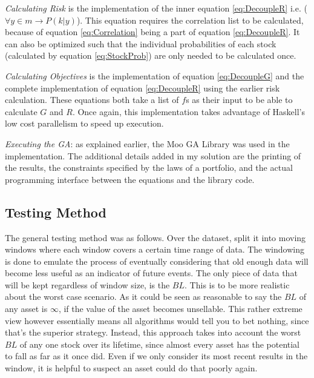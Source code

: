 \documentclass[11pt]{article}
\begin{document}
    \textit{Calculating Risk} is the implementation of the inner equation \ref{eq:DecoupleR} 
    i.e. (\(\forall y \in m \to P(k|y)\)). This equation
    requires the correlation list to be calculated, because of equation \ref{eq:Correlation} being a
    part of equation \ref{eq:DecoupleR}. It can also be optimized such that the individual
    probabilities of each stock (calculated by equation \ref{eq:StockProb}) are only needed to be
    calculated once.

    \textit{Calculating Objectives} is the implementation of equation \ref{eq:DecoupleG} and the complete
    implementation of equation \ref{eq:DecoupleR} using the earlier risk calculation. These
    equations both take a list of \(f\)s as their input to be able to calculate \(G\) and \(R\).
    Once again, this implementation takes advantage of Haskell's low cost parallelism to speed
    up execution.

    \textit{Executing the GA}: as explained earlier, the Moo GA Library \cite{Moo} was used in
    the implementation. The additional details added in my solution are the printing of the results,
    the constraints specified by the laws of a portfolio, and the actual programming interface
    between the equations and the library code.

\subsection{Testing Method}\label{section:TestingMethod}

    The general testing method was as follows. Over the dataset, split it into moving windows
    where each window covers a certain time range of data. The windowing is done to emulate
    the process of eventually considering that old enough data will become less useful
    as an indicator of future events. The only piece of data that will be kept regardless
    of window size, is the \(BL\). This is to be more realistic about the worst case scenario.
    As it could be seen as reasonable to say the \(BL\) of any asset is \(\infty\), if
    the value of the asset becomes unsellable. This rather extreme view however essentially means all
    algorithms would tell you to bet nothing, since that's the superior strategy. Instead,
    this approach takes into account the worst \(BL\) of any one stock over its lifetime,
    since almost every asset has the potential to fall as far as it once did. Even if we only
    consider its most recent results in the window, it is helpful to suspect an asset could
    do that poorly again.
\end{document}

